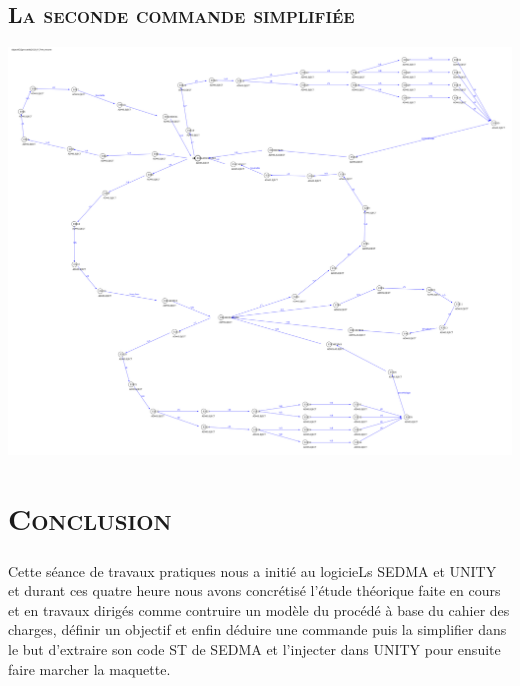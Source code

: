 		  \section{\textsc{La seconde commande simplifiée}}
			
			\begin{center}
			\includegraphics[scale=0.15]{com2s.png}
			\label{fig9}
			\end{center}	
		 
\chapter*{\textsc{Conclusion}}
 
 \paragraph{} Cette séance de travaux pratiques nous a initié au logicieLs SEDMA et UNITY et durant ces quatre heure nous avons concrétisé l'étude théorique faite en cours et en travaux dirigés comme contruire un modèle du procédé à base du cahier des charges, définir un objectif et enfin déduire une commande puis la simplifier dans le but  d'extraire son code ST de SEDMA et l'injecter dans UNITY pour ensuite faire marcher la maquette.    